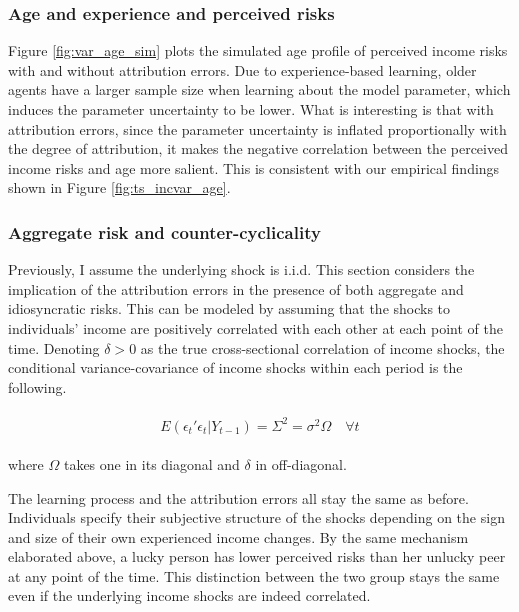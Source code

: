 \documentclass[12pt,notitlepage,onecolumn,aps,pra]{article}
\begin{document}
    \hypertarget{age-and-experience-and-perceived-risks}{%
\subsubsection{Age and experience and perceived
risks}\label{age-and-experience-and-perceived-risks}}

Figure \ref{fig:var_age_sim} plots the simulated age profile of
perceived income risks with and without attribution errors. Due to
experience-based learning, older agents have a larger sample size when
learning about the model parameter, which induces the parameter
uncertainty to be lower. What is interesting is that with attribution
errors, since the parameter uncertainty is inflated proportionally with
the degree of attribution, it makes the negative correlation between the
perceived income risks and age more salient. This is consistent with our
empirical findings shown in Figure \ref{fig:ts_incvar_age}.



    \hypertarget{aggregate-risk-and-counter-cyclicality}{%
\subsubsection{Aggregate risk and
counter-cyclicality}\label{aggregate-risk-and-counter-cyclicality}}

Previously, I assume the underlying shock is i.i.d. This section
considers the implication of the attribution errors in the presence of
both aggregate and idiosyncratic risks. This can be modeled by assuming
that the shocks to individuals' income are positively correlated with
each other at each point of the time. Denoting \(\delta>0\) as the true
cross-sectional correlation of income shocks, the conditional
variance-covariance of income shocks within each period is the
following.

\begin{eqnarray}
\begin{split}
E(\epsilon_{t}'\epsilon_{t}|Y_{t-1}) = \Sigma^2 = \sigma^2\Omega \quad \forall t  
\end{split}
\end{eqnarray}

where \(\Omega\) takes one in its diagonal and \(\delta\) in
off-diagonal.

The learning process and the attribution errors all stay the same as
before. Individuals specify their subjective structure of the shocks
depending on the sign and size of their own experienced income changes.
By the same mechanism elaborated above, a lucky person has lower
perceived risks than her unlucky peer at any point of the time. This
distinction between the two group stays the same even if the underlying
income shocks are indeed correlated.
\end{document}
